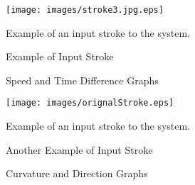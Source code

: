 \begin{figure}[]
	\centering
		\texttt{[image: images/stroke3.jpg.eps]}
	\caption{Example of Input Stroke} Example of an input stroke to the system. 
	\label{fig:orignalStroke}
\end{figure}


\begin{figure}
	\centering
			\hfill
	\caption{Speed and Time Difference Graphs}
	\label{fig:speed2Distance}
\end{figure}

\begin{figure}[]
	\centering
		\texttt{[image: images/orignalStroke.eps]}
	\caption{Another Example of Input Stroke} Example of an input stroke to the system. 
	\label{fig:AnotherorignalStroke}
\end{figure}

\begin{figure}[]
	\centering

		
		
	
	\caption{Curvature and Direction Graphs}%
	
	\label{fig:curvatures}
\end{figure}


